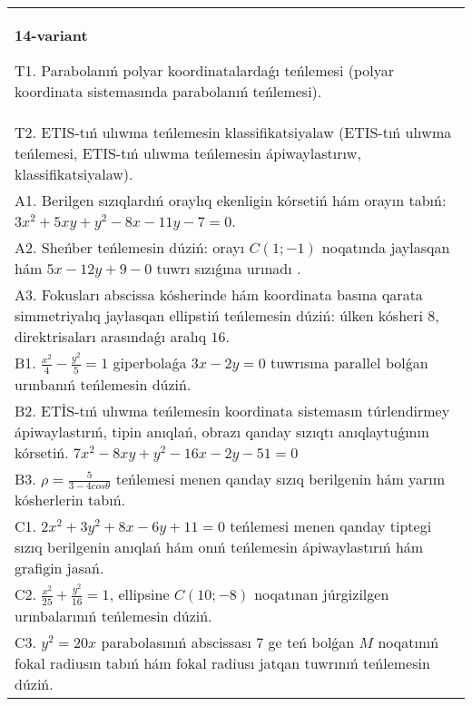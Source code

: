 \documentclass{article}
\begin{document}
\begin{tabular}{m{17cm}}
\textbf{14-variant}
\newline

T1. Parabolanıń polyar koordinatalardaǵı teńlemesi (polyar koordinata sistemasında parabolanıń teńlemesi).\\

T2. ETIS-tıń ulıwma teńlemesin klassifikatsiyalaw (ETIS-tıń ulıwma teńlemesi, ETIS-tıń ulıwma teńlemesin ápiwaylastırıw, klassifikatsiyalaw).\\

A1. Berilgen sızıqlardıń oraylıq ekenligin kórsetiń hám orayın tabıń: $3 x^{2}+5 xy+y^{2}-8 x-11 y-7=0$.\\

A2. Sheńber teńlemesin dúziń: orayı $C (1;-1) $ noqatında jaylasqan hám $5 x-12 y+9 -0$ tuwrı sızıǵına urınadı .\\

A3. Fokusları abscissa kósherinde hám koordinata basına qarata simmetriyalıq jaylasqan ellipstiń teńlemesin dúziń: úlken kósheri $8$, direktrisaları arasındaǵı aralıq $16$.\\

B1. $\frac{x^{2}}{4} - \frac{y^{2}}{5} = 1$ giperbolaǵa $3x - 2y = 0$ tuwrısına parallel bolǵan urınbanıń teńlemesin dúziń.  \\

B2. ETİS-tıń ulıwma teńlemesin koordinata sistemasın túrlendirmey ápiwaylastırıń, tipin anıqlań, obrazı qanday sızıqtı anıqlaytuǵının kórsetiń. $7x^{2} - 8xy + y^{2} - 16x - 2y - 51 = 0$  \\

B3. $\rho = \frac{5}{3 - 4cos\theta}$ teńlemesi menen qanday sızıq berilgenin hám yarım kósherlerin tabıń.  \\

C1. $2x^{2} + 3y^{2} + 8x - 6y + 11 = 0$ teńlemesi menen qanday tiptegi sızıq berilgenin anıqlań hám onıń teńlemesin ápiwaylastırıń hám grafigin jasań.  \\

C2. $\frac{x^{2}}{25} + \frac{y^{2}}{16} = 1$, ellipsine $C(10; - 8)$ noqatınan júrgizilgen urınbalarınıń teńlemesin dúziń.  \\

C3. $y^{2} = 20x$ parabolasınıń abscissası 7 ge teń bolǵan $M$ noqatınıń fokal radiusın tabıń hám fokal radiusı jatqan tuwrınıń teńlemesin dúziń.  \\

\end{tabular}
\vspace{1cm}
\end{document}
